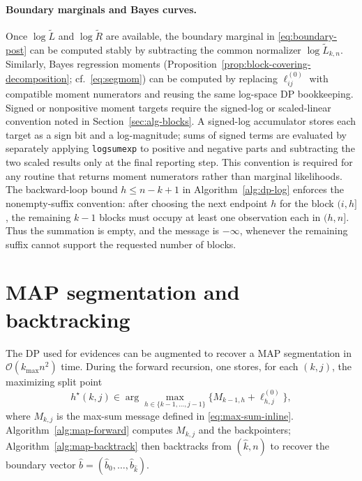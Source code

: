 \paragraph{Boundary marginals and Bayes curves.}
Once $\log\widetilde{L}$ and $\log\widetilde{R}$ are available, the boundary marginal in
\eqref{eq:boundary-post} can be computed stably by subtracting the common normalizer
$\log\widetilde{L}_{k,n}$.
Similarly, Bayes regression moments (Proposition~\ref{prop:block-covering-decomposition}; cf.\ \eqref{eq:segmom})
can be computed by replacing $\ell^{(0)}_{ij}$ with compatible moment numerators and reusing the
same log-space DP bookkeeping. Signed or nonpositive moment targets require the signed-log or
scaled-linear convention noted in Section~\ref{sec:alg-blocks}.
A signed-log accumulator stores each target as a sign bit and a log-magnitude; sums of signed
terms are evaluated by separately applying \texttt{logsumexp} to positive and negative parts
and subtracting the two scaled results only at the final reporting step. This convention is required
for any routine that returns moment numerators rather than marginal likelihoods.
The backward-loop bound $h\le n-k+1$ in Algorithm~\ref{alg:dp-log} enforces the nonempty-suffix
convention: after choosing the next endpoint $h$ for the block $(i,h]$, the remaining $k-1$
blocks must occupy at least one observation each in $(h,n]$. Thus the summation is empty, and the
message is $-\infty$, whenever the remaining suffix cannot support the requested number of blocks.

\section{MAP segmentation and backtracking}
\label{sec:alg-map}

The DP used for evidences can be augmented to recover a MAP segmentation in
$\mathcal{O}(k_{\max}n^2)$ time.
During the forward recursion, one stores, for each $(k,j)$, the maximizing split point
\begin{equation}
    h^\star(k,j)\in\arg\max_{h\in\{k-1,\dots,j-1\}} \Big\{M_{k-1,h}+\ell^{(0)}_{h,j}\Big\},
    \label{eq:map-backpointer}
\end{equation}
where $M_{k,j}$ is the max-sum message defined in \eqref{eq:max-sum-inline}.
Algorithm~\ref{alg:map-forward} computes $M_{k,j}$ and the backpointers; Algorithm~\ref{alg:map-backtrack} then backtracks from $(\widehat{k},n)$ to recover the boundary vector
$\widehat{b}=(\widehat{b}_0,\dots,\widehat{b}_{\widehat{k}})$.

